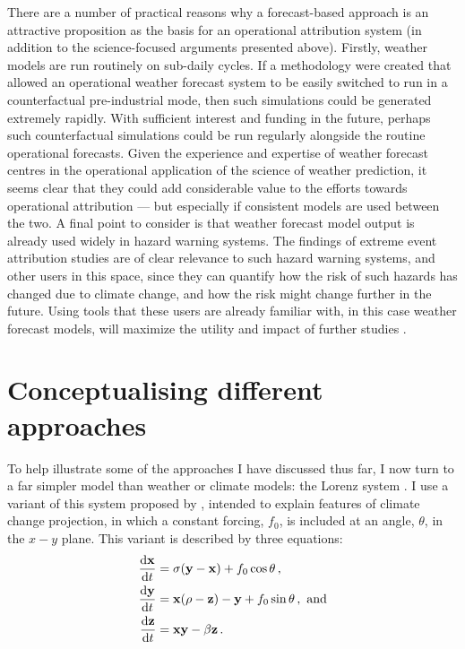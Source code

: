       There are a number of practical reasons why a forecast-based approach is an attractive proposition as the basis for an operational attribution system (in addition to the science-focused arguments presented above). Firstly, weather models are run routinely on sub-daily cycles. If a methodology were created that allowed an operational weather forecast system to be easily switched to run in a counterfactual pre-industrial mode, then such simulations could be generated extremely rapidly. With sufficient interest and funding in the future, perhaps such counterfactual simulations could be run regularly alongside the routine operational forecasts. Given the experience and expertise of weather forecast centres in the operational application of the science of weather prediction, it seems clear that they could add considerable value to the efforts towards operational attribution \citep{wehner_operational_2022} --- but especially if consistent models are used between the two. A final point to consider is that weather forecast model output is already used widely in hazard warning systems. The findings of extreme event attribution studies are of clear relevance to such hazard warning systems, and other users in this space, since they can quantify how the risk of such hazards has changed due to climate change, and how the risk might change further in the future. Using tools that these users are already familiar with, in this case weather forecast models, will maximize the utility and impact of further studies \citep{schaller_role_2020}.

\section{Conceptualising different approaches}\label{intro:conceptualising}

  To help illustrate some of the approaches I have discussed thus far, I now turn to a far simpler model than weather or climate models: the Lorenz system \citep{lorenz_deterministic_1963}. I use a variant of this system proposed by \citet{palmer_nonlinear_1999}, intended to explain features of climate change projection, in which a constant forcing, $f_0$, is included at an angle, $\theta$, in the $x-y$ plane. This variant is described by three equations:
  \begin{align*}
    \frac{\mathrm{d}\mathbf{x}}{\mathrm{d}t} & = \sigma(\mathbf{y}-\mathbf{x}) + f_0 \cos\theta\,, \\
    \frac{\mathrm{d}\mathbf{y}}{\mathrm{d}t} & = \mathbf{x} (\rho - \mathbf{z}) - \mathbf{y} + f_0 \sin\theta\,, \ \textnormal{and} \\
    \frac{\mathrm{d}\mathbf{z}}{\mathrm{d}t} & = \mathbf{xy} - \beta \mathbf{z}\,.
  \end{align*}

